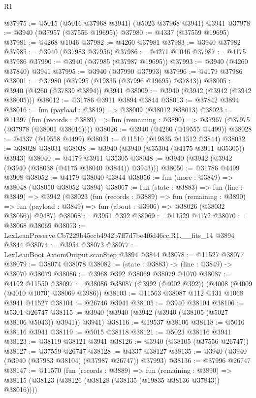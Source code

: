 \begin{lexlean}{R1}
\begin{coremodule}
@37975 := @5015 (@5016 @37968 @3941) (@5023 @37968 @3941) @3941
@37978 := @3940 (@37957 (@37556 @19695))
@37980 := @4337 (@37559 @19695)
@37981 := @4268 @1046
@37982 := @4260 @37981
@37983 := @3940 @37982
@37985 := @3940 (@37983 @37956)
@37986 := @4271 @1046
@37987 := @4175 @37986
@37990 := @3940 (@37985 (@37987 @19695))
@37993 := @3940 (@4260 @37840) @3941
@37995 := @3940 (@37990 @37993)
@37996 := @4179 @37986
@38001 := @37980 (@37995 (@19835 (@37996 @19695) @37843))
@38005 := @3940 (@4260 (@37839 @3894)) @3941
@38009 := @3940 (@3942 (@3942 (@3942 @38005)))
@38012 := @31786 @3911 @3894 @3844
@38013 := @37842 @3894
@38016 := fun (payload : @3849) => @38009 (@38012 @38013)
@38023 := @11397
    (fun (records : @3889) => fun (remaining : @3890) => @37967 (@37975 (@37978 (@38001 @38016))))
@38026 := @3940 (@4260 (@19555 @4499))
@38028 := @4337 (@19558 @4499)
@38031 := @11510 (@19835 @11512 @3844)
@38032 := @38028 @38031
@38038 := @3940 (@3940 (@35304 (@4175 @3911 @35305)) @3943)
@38040 := @4179 @3911 @35305
@38048 := @3940 (@3942 (@3942 (@3940 (@38038 (@4175 @38040 @3844)) @3943)))
@38050 := @31786 @4499 @3908
@38052 := @4179 @38040 @3844
@38056 := fun (more : @3849) => @38048 (@38050 @38052 @3894)
@38067 := fun (state : @3883) =>
  fun (line : @3849) =>
  @3942
    (@38023
      (fun (records : @3889) =>
      fun (remaining : @3890) =>
      fun (payload : @3849) => fun (about : @3906) => @38026 (@38032 @38056))
      @9487)
@38068 := @3951 @392
@38069 := @11529 @4172
@38070 := @38068 @38069
@38073 := LexLeanPreserve.Cb7229b45ecb4942b7ff7d7be4f6d46cc.R1.__fits_14 @3894 @3844
@38074 := @3954 @38073
@38077 := LexLeanBoot.AxiomOutput.scanStep @3894 @3844
@38078 := @11527 @38077
@38079 := @38074 @38078
@38082 := (state : @3883) -> (line : @3849) -> @38070 @38079
@38086 := @3968 @392 @38069 @38079 @1070
@38087 := @4192 @11550
@38097 := @38086 @38087 (@3992 (@4002 @392)) (@4008 (@4009 (@4010 @1070) @38069 @3986))
@38103 := @11563 @38087 @112 @131 @1068 @3941 @11527
@38104 := @26746 @3941
@38105 := @3940 @38104
@38106 := @5301 @26747
@38115 := @3940 (@3940 (@3942 (@3940 (@38105 (@5027 @38106 @5043)) @3941)) @3941)
@38116 := @19537 @38106
@38118 := @5016 @38116 @3941
@38119 := @5015 @38118
@38121 := @5023 @38116 @3941
@38123 := @38119 @38121 @3941
@38126 := @3940 (@38105 (@37556 @26747))
@38127 := @37559 @26747
@38128 := @4337 @38127
@38135 := @3940 (@3940 (@3940 (@37983 @38104) (@37987 @26747)) @37993)
@38136 := @37996 @26747
@38147 := @11570
    (fun (records : @3889) =>
    fun (remaining : @3890) =>
    @38115 (@38123 (@38126 (@38128 (@38135 (@19835 @38136 @37843)) @38016))))

\end{coremodule}
\end{lexlean}

